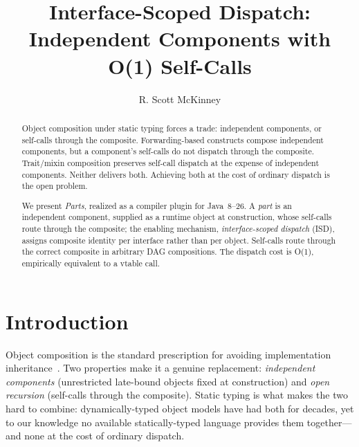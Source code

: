 \documentclass[acmsmall,nonacm]{acmart}
\theoremstyle{acmplain}
\theoremstyle{acmdefinition}
\begin{document}
\title{Interface-Scoped Dispatch:\texorpdfstring{\\}{ }Independent Components with O(1) Self-Calls}

\author{R. Scott McKinney}
\renewcommand{\shortauthors}{McKinney}

\begin{abstract}
Object composition under static typing forces a trade: independent
components, or self-calls through the composite. Forwarding-based constructs compose independent components, but a component's self-calls do not dispatch through the composite. Trait/mixin composition preserves self-call dispatch at the expense of independent
components. Neither delivers both. Achieving both at the cost of ordinary
dispatch is the open problem.

We present \emph{Parts}, realized as a compiler plugin for Java~8--26.
A \emph{part} is an independent component, supplied as a runtime object at
construction, whose self-calls route through the composite; the enabling
mechanism, \emph{interface-scoped dispatch} (ISD), assigns composite identity
per interface rather than per object. Self-calls route
through the correct composite in arbitrary DAG compositions. The dispatch cost is O(1), empirically equivalent to a vtable call.
\end{abstract}

\maketitle

\section{Introduction}

Object composition is the standard prescription for avoiding implementation
inheritance~\cite{gamma1994}. Two properties make it a genuine replacement:
\emph{independent components} (unrestricted late-bound objects fixed at
construction) and \emph{open recursion} (self-calls through the composite).
Static typing is what makes the two hard to combine: dynamically-typed object
models have had both for decades, yet to our knowledge no available statically-typed
language provides them together---and none at the cost of ordinary dispatch.
\end{document}
